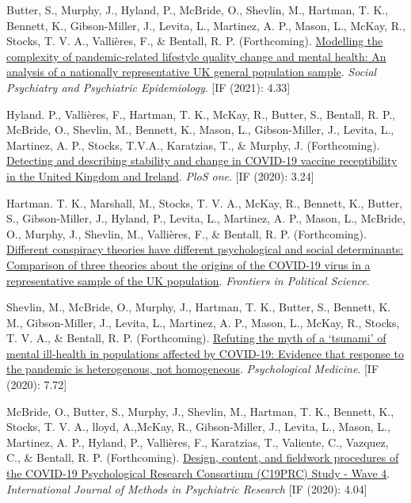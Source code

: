 \documentclass[12pt]{article}
\begin{document}
\begin{bibenum}
\item Butter, S.,  Murphy, J., Hyland, P., McBride, O., Shevlin, M., Hartman, T. K., Bennett, K., Gibson-Miller, J., Levita, L., Martinez, A. P., Mason, L., McKay, R., Stocks, T. V. A., Vallières, F., \& Bentall, R. P. (Forthcoming). \href{https://psyarxiv.com/2vw7d/}{Modelling the complexity of pandemic-related lifestyle quality change and mental health: An analysis of a nationally representative UK general population sample}. 
\emph{Social Psychiatry and Psychiatric Epidemiology}. [IF (2021): 4.33]
		
	\item Hyland. P., Vallières, F., Hartman, T. K., McKay, R., 
	Butter, S., Bentall, R. P., McBride, O., Shevlin, M., Bennett, K., 
	Mason, L., Gibson-Miller, J., Levita, L., Martinez, A. P.,
	Stocks, T.V.A., Karatzias, T., \& Murphy, J. (Forthcoming). 
	\href{}
	{Detecting and describing stability and change in COVID-19 vaccine receptibility in the United Kingdom and Ireland}. 
	\emph{PloS one}. [IF (2020): 3.24]

	\item Hartman. T. K., Marshall, M., Stocks, T. V. A., McKay, R.,  
	Bennett, K., Butter, S., Gibson-Miller, J.,  Hyland, P., Levita, L., Martinez, A. P., 
	Mason, L., McBride, O., Murphy, J., Shevlin, M., Vallières, F., 
	\& Bentall, R. P.  (Forthcoming). 
		\href{https://doi.org/10.3389/fpos.2021.642510}{Different conspiracy theories have 
		different psychological and social determinants: Comparison of three 
		theories about the origins of the COVID-19 virus in a representative 
		sample of the UK population}.
		\emph{Frontiers in Political Science}.
	
	\item Shevlin, M.,  McBride, O., Murphy, J., Hartman, T. K., Butter, S., 
	Bennett, K. M., Gibson-Miller, J., Levita, L., Martinez, A. P., Mason, L., 
	McKay, R., Stocks, T. V. A.,  \& Bentall, R. P. (Forthcoming). 
		\href{https://doi.org/10.1017/S0033291721001665}{Refuting the myth 
		of a ‘tsunami’ of mental ill-health in populations affected by 
		COVID-19: Evidence that response to the pandemic is heterogenous, 
		not homogeneous}.
		\emph{Psychological Medicine}. [IF (2020): 7.72]
		
	\item McBride, O., Butter, S., Murphy, J., Shevlin, M., Hartman, T. K., Bennett, K.,  Stocks, T. V. A., lloyd, A.,McKay, R.,  Gibson-Miller, J.,  Levita, L., Mason, L., Martinez, A. P.,  Hyland, P., Vallières, F., Karatzias, T., Valiente, C., Vazquez, C., \& Bentall, R. P. (Forthcoming). \href{https://psyarxiv.com/nytxc/}{Design, content, and fieldwork procedures of the COVID-19 Psychological Research Consortium (C19PRC) Study - Wave 4}. 
	\emph{International Journal of Methods in Psychiatric Research} [IF (2020): 4.04]


\end{bibenum}
\end{document}
